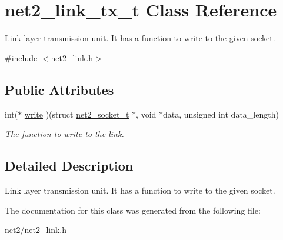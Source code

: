 \hypertarget{structnet2__link__tx__t}{\section{net2\-\_\-link\-\_\-tx\-\_\-t Class Reference}
\label{structnet2__link__tx__t}
}


Link layer transmission unit. It has a function to write to the given socket.  




{\ttfamily \#include $<$net2\-\_\-link.\-h$>$}

\subsection*{Public Attributes}
\begin{DoxyCompactItemize}
\item 
\hypertarget{structnet2__link__tx__t_a3ee6fe19309869057a034bfdc5824df9}{int($\ast$ \hyperlink{structnet2__link__tx__t_a3ee6fe19309869057a034bfdc5824df9}{write} )(struct \hyperlink{structnet2__socket__t}{net2\-\_\-socket\-\_\-t} $\ast$, void $\ast$data, unsigned int data\-\_\-length)}\label{structnet2__link__tx__t_a3ee6fe19309869057a034bfdc5824df9}

\begin{DoxyCompactList}\small\item\em The function to write to the link. \end{DoxyCompactList}\end{DoxyCompactItemize}


\subsection{Detailed Description}
Link layer transmission unit. It has a function to write to the given socket. 

The documentation for this class was generated from the following file\-:\begin{DoxyCompactItemize}
\item 
net2/\hyperlink{net2__link_8h}{net2\-\_\-link.\-h}\end{DoxyCompactItemize}
